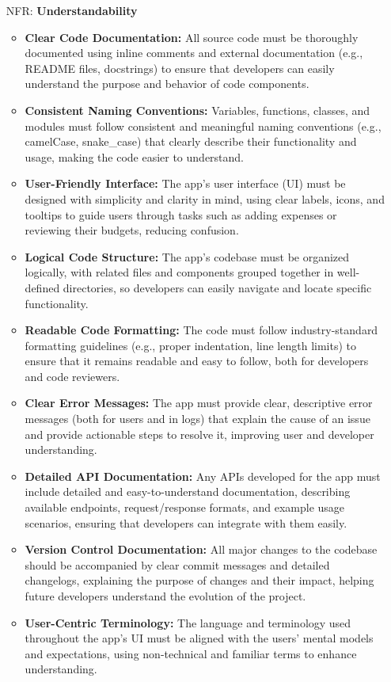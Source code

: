 \documentclass[12pt]{article}
\newcounter{frnum} %
\newcounter{nfrnum} %
\begin{document}
\begin{itemize}
\item[NFR\refstepcounter{nfrnum}\thenfrnum \label{NFR_Understandability}:] \textbf{Understandability} 
\begin{itemize}
	\item \textbf{Clear Code Documentation:} All source code must be thoroughly documented using inline comments and external documentation (e.g., README files, docstrings) to ensure that developers can easily understand the purpose and behavior of code components.
	\item \textbf{Consistent Naming Conventions:} Variables, functions, classes, and modules must follow consistent and meaningful naming conventions (e.g., camelCase, snake\_case) that clearly describe their functionality and usage, making the code easier to understand.
	\item \textbf{User-Friendly Interface:} The app's user interface (UI) must be designed with simplicity and clarity in mind, using clear labels, icons, and tooltips to guide users through tasks such as adding expenses or reviewing their budgets, reducing confusion.
	\item \textbf{Logical Code Structure:} The app's codebase must be organized logically, with related files and components grouped together in well-defined directories, so developers can easily navigate and locate specific functionality.
	\item \textbf{Readable Code Formatting:} The code must follow industry-standard formatting guidelines (e.g., proper indentation, line length limits) to ensure that it remains readable and easy to follow, both for developers and code reviewers.
	\item \textbf{Clear Error Messages:} The app must provide clear, descriptive error messages (both for users and in logs) that explain the cause of an issue and provide actionable steps to resolve it, improving user and developer understanding.
	\item \textbf{Detailed API Documentation:} Any APIs developed for the app must include detailed and easy-to-understand documentation, describing available endpoints, request/response formats, and example usage scenarios, ensuring that developers can integrate with them easily.
	\item \textbf{Version Control Documentation:} All major changes to the codebase should be accompanied by clear commit messages and detailed changelogs, explaining the purpose of changes and their impact, helping future developers understand the evolution of the project.
	\item \textbf{User-Centric Terminology:} The language and terminology used throughout the app's UI must be aligned with the users' mental models and expectations, using non-technical and familiar terms to enhance understanding.
\end{itemize}

\end{itemize}
\end{document}

